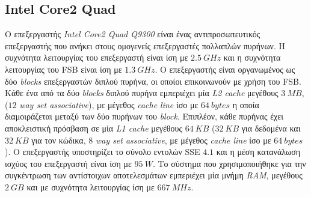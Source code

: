 \subsection[6.1.2 Intel Core2 Quad]{Intel Core2 Quad}
\label{subsection:sub612}
\indent
Ο επεξεργαστής \textsl{Intel Core2 Quad Q9300} είναι ένας αντιπροσωπευτικός επεξεργαστής που ανήκει στους ομογενείς επεξεργαστές πολλαπλών πυρήνων. Η συχνότητα λειτουργίας του επεξεργαστή είναι ίση με \(2.5\ GHz\) και η συχνότητα λειτουργίας του \ac{FSB} είναι ίση με \(1.3\ GHz\). Ο επεξεργαστής είναι οργανωμένος ως δύο \textsl{blocks} επεξεργαστών διπλού πυρήνα, οι οποίοι επικοινωνούν με χρήση του \ac{FSB}. Κάθε ένα από τα δύο \textsl{blocks} διπλού πυρήνα εμπεριέχει μία \textsl{L2 cache} μεγέθους \(3\ MB\), (\(12\) \textsl{way set associative}), με μέγεθος \textsl{cache line} ίσο με \(64\ bytes\) η οποία διαμοιράζεται μεταξύ των δύο πυρήνων του \textsl{block}. Επιπλέον, κάθε πυρήνας έχει αποκλειστική πρόσβαση σε μία \textsl{L1 cache} μεγέθους \(64\ KB\) (\(32\ KB\) για δεδομένα και \(32\ KB\) για τον κώδικα, \(8\) \textsl{way set associative}, με μέγεθος \textsl{cache line} ίσο με \(64\ bytes\)). Ο επεξεργαστής υποστηρίζει το σύνολο εντολών \ac{SSE} \(4.1\) και η μέση κατανάλωση ισχύος του επεξεργαστή είναι ίση με \(95\ W\). Το σύστημα που χρησιμοποιήθηκε για την συγκέντρωση των αντίστοιχων αποτελεσμάτων εμπεριέχει μία μνήμη \textsl{RAM}, μεγέθους \(2\ GB\) και με συχνότητα λειτουργίας ίση με \(667\ MHz\).

